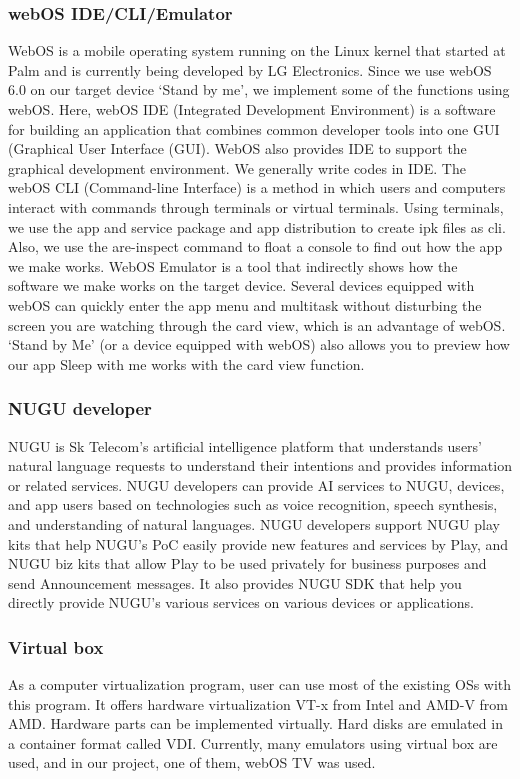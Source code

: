 \documentclass[conference]{IEEEtran}
\begin{document}
\subsubsection{webOS IDE/CLI/Emulator}
WebOS is a mobile operating system running on the Linux kernel that started at Palm and is currently being developed by LG Electronics. Since we use webOS 6.0 on our target device ‘Stand by me’, we implement some of the functions using webOS. 
Here, webOS IDE (Integrated Development Environment) is a software for building an application that combines common developer tools into one GUI (Graphical User Interface (GUI). WebOS also provides IDE to support the graphical development environment. We generally write codes in IDE.
The webOS CLI (Command-line Interface) is a method in which users and computers interact with commands through terminals or virtual terminals. Using terminals, we use the app and service package and app distribution to create ipk files as cli. Also, we use the are-inspect command to float a console to find out how the app we make works.
WebOS Emulator is a tool that indirectly shows how the software we make works on the target device. Several devices equipped with webOS can quickly enter the app menu and multitask without disturbing the screen you are watching through the card view, which is an advantage of webOS. ‘Stand by Me’ (or a device equipped with webOS) also allows you to preview how our app Sleep with me works with the card view function.
\vspace{1\baselineskip}
\subsubsection{NUGU developer}
NUGU is Sk Telecom's artificial intelligence platform that understands users' natural language requests to understand their intentions and provides information or related services. NUGU developers can provide AI services to NUGU, devices, and app users based on technologies such as voice recognition, speech synthesis, and understanding of natural languages. NUGU developers support NUGU play kits that help NUGU's PoC easily provide new features and services by Play, and NUGU biz kits that allow Play to be used privately for business purposes and send Announcement messages. It also provides NUGU SDK that help you directly provide NUGU's various services on various devices or applications.
\vspace{1\baselineskip}
\subsubsection{Virtual box}
As a computer virtualization program, user can use most of the existing OSs with this program. It offers hardware virtualization VT-x from Intel and AMD-V from AMD. Hardware parts can be implemented virtually. Hard disks are emulated in a container format called VDI. Currently, many emulators using virtual box are used, and in our project, one of them, webOS TV was used.
\vspace{1\baselineskip}
\end{document}
